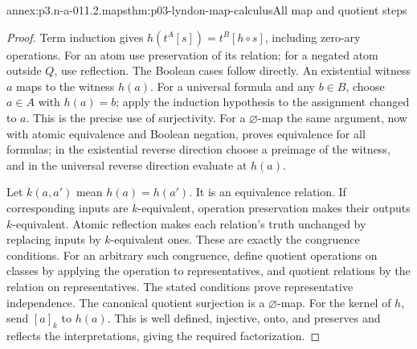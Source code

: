 \begin{annexitem}{annex:p3.n-a-011.2.maps}{thm:p03-lyndon-map-calculus}{All map and quotient steps}
\begin{proof}
Term induction gives
\(h(t^A[s])=t^B[h\circ s]\), including zero-ary operations.
For an atom use preservation of its relation; for a negated atom outside
\(Q\), use reflection. The Boolean cases follow directly. An existential
witness \(a\) maps to the witness \(h(a)\). For a universal formula
and any \(b\in B\), choose \(a\in A\) with \(h(a)=b\); apply the
induction hypothesis to the assignment changed to \(a\). This is the
precise use of surjectivity. For a \(\varnothing\)-map the same argument,
now with atomic equivalence and Boolean negation, proves equivalence for
all formulas; in the existential reverse direction choose a preimage of
the witness, and in the universal reverse direction evaluate at \(h(a)\).

Let \(k(a,a')\) mean \(h(a)=h(a')\). It is an equivalence relation.
If corresponding inputs are \(k\)-equivalent, operation preservation
makes their outputs \(k\)-equivalent. Atomic reflection makes each
relation's truth unchanged by replacing inputs by \(k\)-equivalent
ones. These are exactly the congruence conditions. For an arbitrary such
congruence, define quotient operations on classes by applying the operation
to representatives, and quotient relations by the relation on
representatives. The stated conditions prove representative independence.
The canonical quotient surjection is a \(\varnothing\)-map. For the
kernel of \(h\), send \([a]_k\) to \(h(a)\). This is well defined,
injective, onto, and preserves and reflects the interpretations, giving
the required factorization.
\end{proof}
\end{annexitem}

